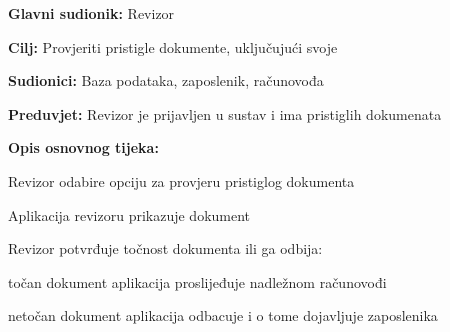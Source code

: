 					\noindent {}
					\begin{packed_item}
	
						\item \textbf{Glavni sudionik:} Revizor
						\item  \textbf{Cilj:} Provjeriti pristigle dokumente, uključujući svoje
						\item  \textbf{Sudionici:} Baza podataka, zaposlenik, računovođa
						\item  \textbf{Preduvjet:} Revizor je prijavljen u sustav i ima pristiglih dokumenata
						\item  \textbf{Opis osnovnog tijeka:}
						
						\item[] \begin{packed_enum}
	
							\item Revizor odabire opciju za provjeru pristiglog dokumenta
							\item Aplikacija revizoru prikazuje dokument
							\item Revizor potvrđuje točnost dokumenta ili ga odbija:
							
							\begin{packed_enum}
								
								\item točan dokument aplikacija proslijeđuje nadležnom računovođi
								\item netočan dokument aplikacija odbacuje i o tome dojavljuje zaposlenika

							\end{packed_enum}

						\end{packed_enum}

					\end{packed_item}


